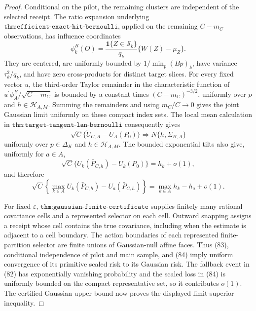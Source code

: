 \documentclass{article}
\begin{document}
\begin{proof}
Conditional on the pilot, the remaining clusters are independent of the selected receipt.  The ratio expansion underlying \(\texttt{thm:efficient-exact-hit-bernoulli}\), applied on the remaining \(C-m_C\) observations, has influence coordinates
\[
\phi_k^B(O)=\frac{\mathbf1\{Z\in\mathcal S_k\}}{q_k}
\{W(Z)-\mu_Z\}.
\]
They are centered, are uniformly bounded by \(1/\min_{p}(Bp)_k\), have variance \(\tau_k^2/q_k\), and have zero cross-products for distinct target slices.  For every fixed vector \(u\), the third-order Taylor remainder in the characteristic function of \(u^{\prime}\phi_A^B/\sqrt{C-m_C}\) is bounded by a constant times \((C-m_C)^{-3/2}\), uniformly over \(p\) and \(h\in\mathscr H_{A,M}\).  Summing the remainders and using \(m_C/C\to0\) gives the joint Gaussian limit uniformly on these compact index sets.  The local mean calculation in \(\texttt{thm:target-tangent-lan-bernoulli}\) consequently gives
\[
\sqrt C\{\widetilde U_{C,A}-U_A(P_0)\}
\Rightarrow N\{h,\Sigma_{B,A}\}                                 \tag{83}
\]
uniformly over \(p\in\Delta_K\) and \(h\in\mathscr H_{A,M}\).  The bounded exponential tilts also give, uniformly for \(a\in A\),
\[
\sqrt C\{U_k(\bar P_{C,h})-U_k(P_0)\}=h_k+o(1),
\]
and therefore
\[
\sqrt C\!\left\{\max_{k\in A}U_k(\bar P_{C,h})
-U_a(\bar P_{C,h})\right\}
=\max_{k\in A}h_k-h_a+o(1).                                     \tag{84}
\]

For fixed \(\varepsilon\), \(\texttt{thm:gaussian-finite-certificate}\) supplies finitely many rational covariance cells and a represented selector on each cell.  Outward snapping assigns a receipt whose cell contains the true covariance, including when the estimate is adjacent to a cell boundary.  The action boundaries of each represented finite-partition selector are finite unions of Gaussian-null affine faces.  Thus (83), conditional independence of pilot and main sample, and (84) imply uniform convergence of its primitive scaled risk to its Gaussian risk.  The fallback event in (82) has exponentially vanishing probability and the scaled loss in (84) is uniformly bounded on the compact representative set, so it contributes \(o(1)\).  The certified Gaussian upper bound now proves the displayed limit-superior inequality.


\end{proof}
\end{document}
